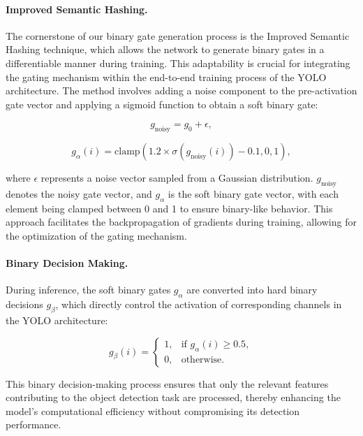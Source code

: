 \paragraph{Improved Semantic Hashing.} The cornerstone of our binary gate generation process is the Improved Semantic Hashing technique, which allows the network to generate binary gates in a differentiable manner during training. This adaptability is crucial for integrating the gating mechanism within the end-to-end training process of the YOLO architecture. The method involves adding a noise component to the pre-activation gate vector and applying a sigmoid function to obtain a soft binary gate:

\begin{equation}
g_{\text{noisy}} = g_0 + \epsilon,
\label{eq:noisy_g}
\end{equation}

\begin{equation}
g_{\alpha}(i) = \text{clamp}(1.2 \times \sigma(g_{\text{noisy}}(i)) - 0.1, 0, 1),
\label{eq:soft_binary_gate}
\end{equation}

where \(\epsilon\) represents a noise vector sampled from a Gaussian distribution. \(g_{\text{noisy}}\) denotes the noisy gate vector, and \(g_{\alpha}\) is the soft binary gate vector, with each element being clamped between 0 and 1 to ensure binary-like behavior. This approach facilitates the backpropagation of gradients during training, allowing for the optimization of the gating mechanism.

\paragraph{Binary Decision Making.} During inference, the soft binary gates \(g_{\alpha}\) are converted into hard binary decisions \(g_{\beta}\), which directly control the activation of corresponding channels in the YOLO architecture:

\begin{equation}
g_{\beta}(i) = 
\begin{cases}
1, & \text{if } g_{\alpha}(i) \geq 0.5,\\
0, & \text{otherwise}.
\end{cases}
\label{eq:hard_binary_decision}
\end{equation}

This binary decision-making process ensures that only the relevant features contributing to the object detection task are processed, thereby enhancing the model's computational efficiency without compromising its detection performance.

